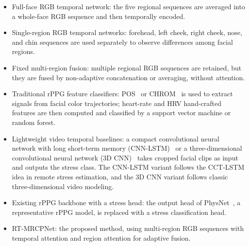 \documentclass[runningheads]{llncs}
\begin{document}
\begin{itemize}
    \item Full-face RGB temporal network: the five regional sequences are averaged into a whole-face RGB sequence and then temporally encoded.
    \item Single-region RGB temporal networks: forehead, left cheek, right cheek, nose, and chin sequences are used separately to observe differences among facial regions.
    \item Fixed multi-region fusion: multiple regional RGB sequences are retained, but they are fused by non-adaptive concatenation or averaging, without attention.
    \item Traditional rPPG feature classifiers: POS~\cite{wang2017pos} or CHROM~\cite{dehaan2013chrom} is used to extract signals from facial color trajectories; heart-rate and HRV hand-crafted features are then computed and classified by a support vector machine or random forest.
    \item Lightweight video temporal baselines: a compact convolutional neural network with long short-term memory (CNN-LSTM)~\cite{ziaratnia2024cctlstm} or a three-dimensional convolutional neural network (3D CNN)~\cite{tran2015c3d} takes cropped facial clips as input and outputs the stress class. The CNN-LSTM variant follows the CCT-LSTM idea in remote stress estimation, and the 3D CNN variant follows classic three-dimensional video modeling.
    \item Existing rPPG backbone with a stress head: the output head of PhysNet~\cite{yu2019physnet}, a representative rPPG model, is replaced with a stress classification head.
    \item RT-MRCPNet: the proposed method, using multi-region RGB sequences with temporal attention and region attention for adaptive fusion.
\end{itemize}
\end{document}
